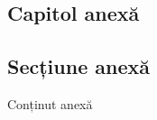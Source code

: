 \begin{appendices}
\chapter{Capitol anexă}

\section{Secțiune anexă}

Conținut anexă

\end{appendices}

